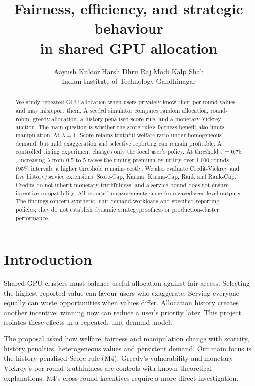 \documentclass{article}
\title{Fairness, efficiency, and strategic behaviour\\in shared GPU allocation}
\author{Aayush Kuloor \quad Harsh Dhru \quad Raj Modi \quad Kalp Shah \\
  Indian Institute of Technology Gandhinagar}
\begin{document}
\maketitle
\thispagestyle{empty}

\begin{abstract}
We study repeated GPU allocation when users privately know their per-round
values and may misreport them. A seeded simulator compares random allocation,
round-robin, greedy allocation, a history-penalised score rule, and a monetary
Vickrey auction. The main question is whether the score rule's fairness benefit
also limits manipulation. At $\lambda=1$, Score retains truthful welfare ratio
\TruthScoreWR{} under homogeneous demand, but mild exaggeration and selective
reporting can remain profitable. A controlled timing experiment changes only
the focal user's policy. At threshold $\tau=0.75$, increasing $\lambda$ from
$0.5$ to $5$ raises the timing premium by \TimingTrend{} utility over 1,000
rounds (95\% interval); a higher threshold remains costly.
We also evaluate Credit-Vickrey and five history/service extensions:
Score-Cap, Karma, Karma-Cap, Rank and Rank-Cap. Credits do not inherit monetary
truthfulness, and a service bound does not ensure incentive compatibility.
All reported measurements come from saved seed-level outputs. The findings
concern synthetic, unit-demand workloads and specified reporting policies;
they do not establish dynamic strategyproofness or production-cluster performance.
\end{abstract}

\section{Introduction}
Shared GPU clusters must balance useful allocation against fair access.
Selecting the highest reported value can favour users who exaggerate. Serving
everyone equally can waste opportunities when values differ. Allocation
history creates another incentive: winning now can reduce a user's priority
later. This project isolates these effects in a repeated, unit-demand model.

The proposal asked how welfare, fairness and manipulation change with scarcity,
history penalties, heterogeneous values and persistent demand. Our main focus
is the history-penalised Score rule (M4). Greedy's vulnerability and monetary
Vickrey's per-round truthfulness are controls with known theoretical
explanations. M4's cross-round incentives require a more direct investigation.
\end{document}
